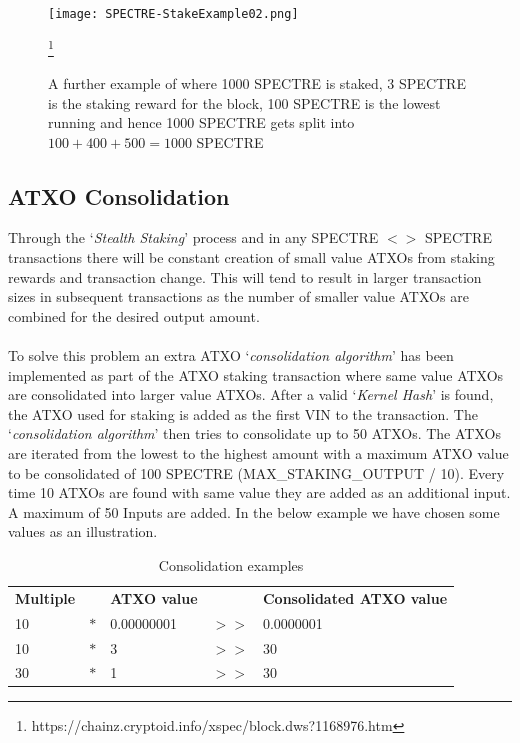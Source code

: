 \begin{figure}[ht]
	\centering
	\texttt{[image: SPECTRE-StakeExample02.png]}
	\caption{A further example of where 1000 SPECTRE is staked, 3 SPECTRE 
	is the staking reward for the block, 100 SPECTRE is the lowest running 
	and hence 1000 SPECTRE gets split into $100 + 400 + 500 = 1000$ SPECTRE}
	\footnote{https://chainz.cryptoid.info/xspec/block.dws?1168976.htm}
\end{figure}



\subsection{ATXO Consolidation}
Through the ‘\textit{Stealth Staking}’ process and in any SPECTRE $<>$
SPECTRE transactions there will be constant creation of small value ATXOs
from staking rewards and transaction change. This will tend to result in
larger transaction sizes in subsequent transactions as the number of
smaller value ATXOs are combined for the desired output amount.
\\
\\
\noindent
To solve this problem an extra ATXO ‘\textit{consolidation algorithm}’
has been implemented as part of the ATXO staking transaction where same
value ATXOs are consolidated into larger value ATXOs. After a valid
‘\textit{Kernel Hash}’ is found, the ATXO used for staking is added
as the first VIN to the transaction. The ‘\textit{consolidation algorithm}’
then tries to consolidate up to 50 ATXOs. The ATXOs are iterated from the
lowest to the highest amount with a maximum ATXO value to be consolidated
of 100 SPECTRE (MAX\_STAKING\_OUTPUT / 10). Every time 10 ATXOs are found
with same value they are added as an additional input. A maximum of 50
Inputs are added. In the below example we have chosen some values as an
illustration.



   \begin{table}[h]
	\centering
	\begin{tabular}{lllll}
		\textbf{Multiple} &     & \textbf{ATXO value} &      & \textbf{Consolidated ATXO value} \\
		10                & $*$ & 0.00000001          & $>>$ & 0.0000001 \\
		10                & $*$ & 3                   & $>>$ & 30        \\
		30                & $*$ & 1                   & $>>$ & 30        \\
	\end{tabular}

	\caption{Consolidation examples}
	\label{tbl:consolidationExamples}
\end{table}

